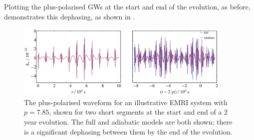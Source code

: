 Plotting the plus-polarised GWs at the start and end of the evolution, as before, demonstrates this dephasing, as shown in .
\begin{figure}
\centering
\includegraphics[width=0.92\textwidth]{Fig_dephased_waveform}
\caption{\label{fig:dephased-waveform}The plus-polarised waveform for an illustrative EMRI system with $p=7.85$, shown for two short segments at the start and end of a $2$ year evolution. The full and adiabatic models are both shown; there is a significant dephasing between them by the end of the evolution.}
\end{figure}


